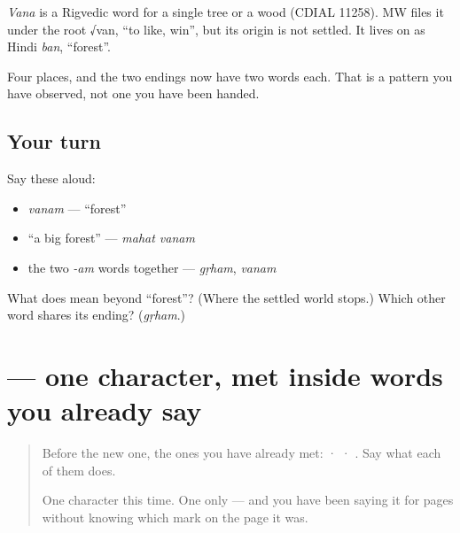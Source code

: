 \begin{cousinweb}
\emph{Vana} is a Rigvedic word for a single tree or a wood (CDIAL 11258). MW files it under the root √van, \textquotedblleft{}to like, win\textquotedblright{}, but its origin is not settled. It lives on as Hindi \emph{ban}, \textquotedblleft{}forest\textquotedblright{}.
\end{cousinweb}

\begin{grammarlens}[title={What you've built}]
Four places, and the two endings now have two words each. That is a pattern you have observed, not one you have been handed.
\end{grammarlens}

\subsection*{Your turn}
Say these aloud:

\begin{itemize}
\raggedright
  \item \emph{vanam} — \textquotedblleft{}forest\textquotedblright{}
  \item \textquotedblleft{}a big forest\textquotedblright{} — \emph{mahat vanam}
  \item the two \emph{-am} words together — \emph{gṛham}, \emph{vanam}
\end{itemize}

\begin{tcolorbox}[breakable,colback=teal!4,colframe=teal!35!black,title={Before you move on}]
What does  mean beyond \textquotedblleft{}forest\textquotedblright{}? (Where the settled world stops.) Which other word shares its ending? (\emph{gṛham}.)
\end{tcolorbox}
\section[\texorpdfstring{\sk{ग} (ga)}{ग (ga)}]{ — one character, met inside words you already say}

\label{lesson:SA-S218-letter-ga}



\begin{quote}
Before the new one, the ones you have already met:  ·  · . Say what each of them does.

One character this time. One only — and you have been saying it for pages without knowing which mark on the page it was.
\end{quote}

